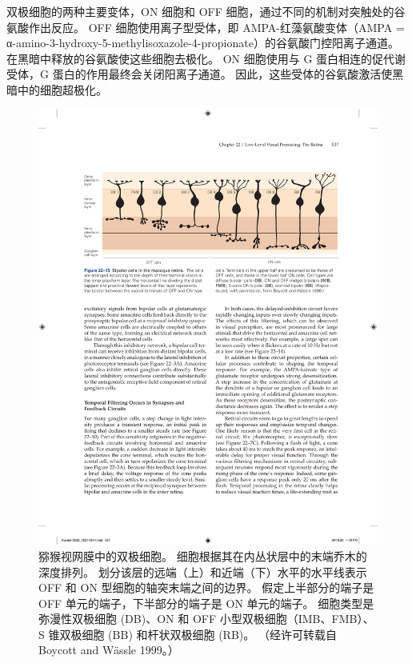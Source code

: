 双极细胞的两种主要变体，ON 细胞和 OFF 细胞，通过不同的机制对突触处的谷氨酸作出反应。 
OFF 细胞使用离子型受体，即 AMPA-红藻氨酸变体（AMPA = α-amino-3-hydroxy-5-methylisoxazole-4-propionate）的谷氨酸门控阳离子通道。 
在黑暗中释放的谷氨酸使这些细胞去极化。 
ON 细胞使用与 G 蛋白相连的促代谢受体，G 蛋白的作用最终会关闭阳离子通道。 
因此，这些受体的谷氨酸激活使黑暗中的细胞超极化。


\begin{figure}[htbp]
	\centering
	\includegraphics[width=1.0\linewidth]{chap22/fig_22_15}
	\caption{猕猴视网膜中的双极细胞。 
		细胞根据其在内丛状层中的末端乔木的深度排列。 
		划分该层的远端（上）和近端（下）水平的水平线表示 OFF 和 ON 型细胞的轴突末端之间的边界。 
		假定上半部分的端子是 OFF 单元的端子，下半部分的端子是 ON 单元的端子。 
		细胞类型是弥漫性双极细胞 (DB)、ON 和 OFF 小型双极细胞（IMB、FMB）、S 锥双极细胞 (BB) 和杆状双极细胞 (RB)。 （经许可转载自 Boycott and Wässle 1999。）}
	\label{fig:22_15}
\end{figure}

